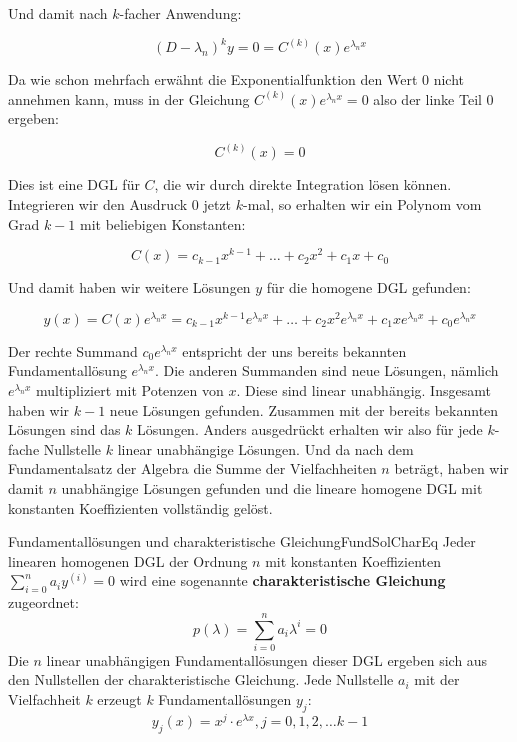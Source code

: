 Und damit nach $k$-facher Anwendung:

$$
    (D-\lambda_n)^k y = 0 = C^{(k)}(x) e^{\lambda_n x}
$$

Da wie schon mehrfach erwähnt die Exponentialfunktion den Wert $0$ nicht annehmen kann, muss in der Gleichung $C^{(k)}(x) e^{\lambda_n x} = 0$ also der linke Teil $0$ ergeben:

$$
    C^{(k)}(x) = 0
$$

Dies ist eine DGL für $C$, die wir durch direkte Integration lösen können. Integrieren wir den Ausdruck $0$ jetzt $k$-mal, so erhalten wir ein Polynom vom Grad $k-1$ mit beliebigen Konstanten:

$$
    C(x) = c_{k-1} x^{k-1} + \dots + c_2 x^2 + c_1 x + c_0
$$

Und damit haben wir weitere Lösungen $y$ für die homogene DGL gefunden:

$$
    y(x) = C(x) e^{\lambda_n x} = c_{k-1} x^{k-1} e^{\lambda_n x} + \dots + c_2 x^2 e^{\lambda_n x} + c_1 x e^{\lambda_n x} + c_0 e^{\lambda_n x}
$$

Der rechte Summand $c_0 e^{\lambda_n x}$ entspricht der uns bereits bekannten Fundamentallösung $e^{\lambda_n x}$. Die anderen Summanden sind neue Lösungen, nämlich $e^{\lambda_n x}$ multipliziert mit Potenzen von $x$. Diese sind linear unabhängig. Insgesamt haben wir $k-1$ neue Lösungen gefunden. Zusammen mit der bereits bekannten Lösungen sind das $k$ Lösungen. Anders ausgedrückt erhalten wir also für jede $k$-fache Nullstelle $k$ linear unabhängige Lösungen. Und da nach dem Fundamentalsatz der Algebra die Summe der Vielfachheiten $n$ beträgt, haben wir damit $n$ unabhängige Lösungen gefunden und die lineare homogene DGL mit konstanten Koeffizienten vollständig gelöst.

\begin{statement}{Fundamentallösungen und charakteristische Gleichung}{FundSolCharEq}
    Jeder linearen homogenen DGL der Ordnung $n$ mit konstanten Koeffizienten $\sum\limits_{i=0}^n a_i y^{(i)} = 0$ wird eine sogenannte \textbf{charakteristische Gleichung} zugeordnet:
    $$
        p(\lambda) = \sum\limits_{i=0}^n a_i \lambda^i = 0
    $$
    Die $n$ linear unabhängigen Fundamentallösungen dieser DGL ergeben sich aus den Nullstellen der charakteristische Gleichung. Jede Nullstelle $a_i$ mit der Vielfachheit $k$ erzeugt $k$ Fundamentallösungen $y_j$:
    $$
        y_j(x) = x^j \cdot e^{\lambda x}, j = 0, 1, 2, \dots {k-1}
    $$
\end{statement}

